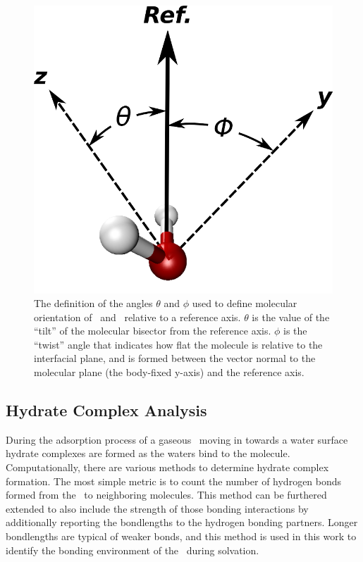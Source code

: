 \begin{figure}[h!]
	\begin{center}
		\includegraphics[scale=1.0]{images/wateranglessmall.png}
		\caption{The definition of the angles $\theta$ and $\phi$ used to define molecular orientation of \suldiox~and \wat~relative to a reference axis. $\theta$ is the value of the ``tilt'' of the molecular bisector from the reference axis. $\phi$ is the ``twist'' angle that indicates how flat the molecule is relative to the interfacial plane, and is formed between the vector normal to the molecular plane (the body-fixed y-axis) and the reference axis.}
		\label{fig:water-angles}
	\end{center}
\end{figure}

\subsection{Hydrate Complex Analysis}

	During the adsorption process of a gaseous \suldiox~moving in towards a water surface hydrate complexes are formed as the waters bind to the molecule. Computationally, there are various methods to determine hydrate complex formation. The most simple metric is to count the number of hydrogen bonds formed from the \suldiox~to neighboring molecules. This method can be furthered extended to also include the strength of those bonding interactions by additionally reporting the bondlengths to the hydrogen bonding partners. Longer bondlengths are typical of weaker bonds, and this method is used in this work to identify the bonding environment of the \suldiox~during solvation.

